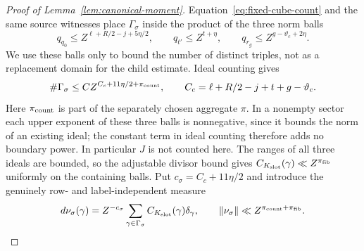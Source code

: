 \documentclass[12pt]{article}
\begin{document}
\begin{proof}[Proof of Lemma~\ref{lem:canonical-moment}]
Equation~\eqref{eq:fixed-cube-count} and the same source witnesses
place \(\Gamma_\sigma\) inside the product of the three norm balls
\[
 q_{q_0}\le Z^{\ell+R/2-j+5\eta/2},\qquad
 q_{t'}\le Z^{t+\eta},\qquad q_{r_g}\le Z^{g-\vartheta_c+2\eta}.
\]
We use these balls only to bound the number of distinct triples, not
as a replacement domain for the child estimate.  Ideal counting gives
\begin{equation}\label{eq:canonical-fixed-count}
 \#\Gamma_\sigma\le C Z^{C_c+11\eta/2+\pi_{\rm count}},\qquad
 C_c=\ell+R/2-j+t+g-\vartheta_c.
\end{equation}
Here \(\pi_{\rm count}\) is part of the separately chosen aggregate
\(\pi\).  In a nonempty sector each upper exponent of these three
balls is nonnegative, since it bounds the norm of an existing ideal;
the constant term in ideal counting therefore adds no boundary power.
In particular \(J\) is not counted here.  The ranges of all three
ideals are bounded, so the adjustable divisor bound gives
\(C_{K_{\rm slot}}(\gamma)\ll Z^{\pi_{\rm fib}}\) uniformly on
the containing balls.  Put \(c_\sigma=C_c+11\eta/2\) and introduce
the genuinely row- and label-independent measure
\begin{equation}\label{eq:inverse-normalized-triples}
 d\nu_\sigma(\gamma)=Z^{-c_\sigma}
 \sum_{\gamma\in\Gamma_\sigma}C_{K_{\rm slot}}(\gamma)\delta_\gamma,
 \qquad \|\nu_\sigma\|\ll Z^{\pi_{\rm count}+\pi_{\rm fib}}.
\end{equation}


\end{proof}
\end{document}

